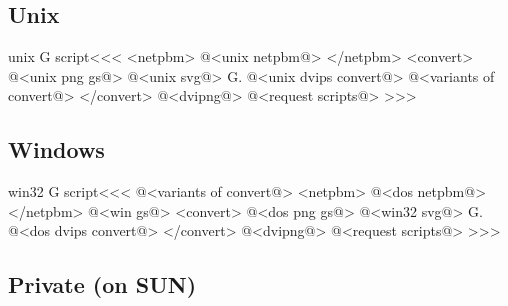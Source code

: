 \documentclass{article}
\begin{document}
\subsection{Unix}




\<unix G script\><<<
<netpbm>
@<unix netpbm@>
</netpbm>
<convert>
@<unix png gs@>
@<unix svg@>
G.
@<unix dvips convert@>
@<variants of convert@>
</convert>    
@<dvipng@>
@<request scripts@> %
>>>


\subsection{Windows}



\<win32 G script\><<<
@<variants of convert@>
<netpbm>
@<dos netpbm@>
</netpbm>
@<win gs@>
<convert>
@<dos png gs@>
@<win32 svg@>
G.
@<dos dvips convert@>
</convert>
@<dvipng@>
@<request scripts@> %
>>>


\subsection{Private (on SUN)}
\end{document}
